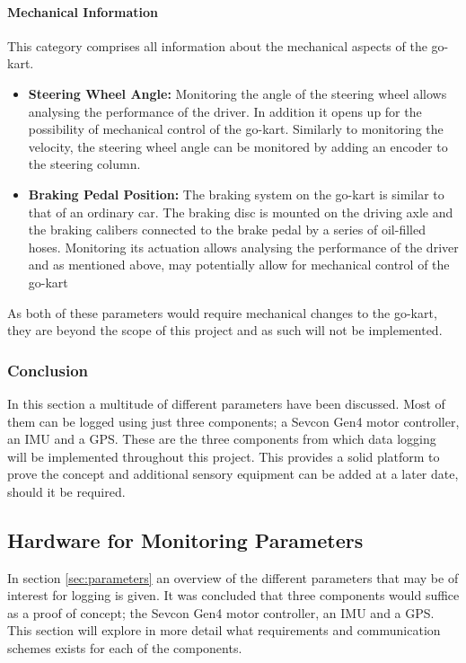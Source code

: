 \paragraph*{Mechanical Information}
This category comprises all information about the mechanical aspects of the go-kart.
\begin{itemize}
	\item \textbf{Steering Wheel Angle:} Monitoring the angle of the steering wheel allows analysing the performance of the driver.
	In addition it opens up for the possibility of mechanical control of the go-kart.
	Similarly to monitoring the velocity, the steering wheel angle can be monitored by adding an encoder to the steering column.
	\item \textbf{Braking Pedal Position:} The braking system on the go-kart is similar to that of an ordinary car.
	The braking disc is mounted on the driving axle and the braking calibers connected to the brake pedal by a series of oil-filled hoses.
	Monitoring its actuation allows analysing the performance of the driver and as mentioned above, may potentially allow for mechanical control of the go-kart
\end{itemize}
As both of these parameters would require mechanical changes to the go-kart, they are beyond the scope of this project and as such will not be implemented.
\subsubsection*{Conclusion}
In this section a multitude of different parameters have been discussed.
Most of them can be logged using just three components; a Sevcon Gen4 motor controller, an IMU and a GPS.
These are the three components from which data logging will be implemented throughout this project.
This provides a solid platform to prove the concept and additional sensory equipment can be added at a later date, should it be required.


























\subsection{Hardware for Monitoring Parameters}
\label{sec:hardware_for_par}
In section \ref{sec:parameters} an overview of the different parameters that may be of interest for logging is given.
It was concluded that three components would suffice as a proof of concept; the Sevcon Gen4 motor controller, an IMU and a GPS.
This section will explore in more detail what requirements and communication schemes exists for each of the components.

